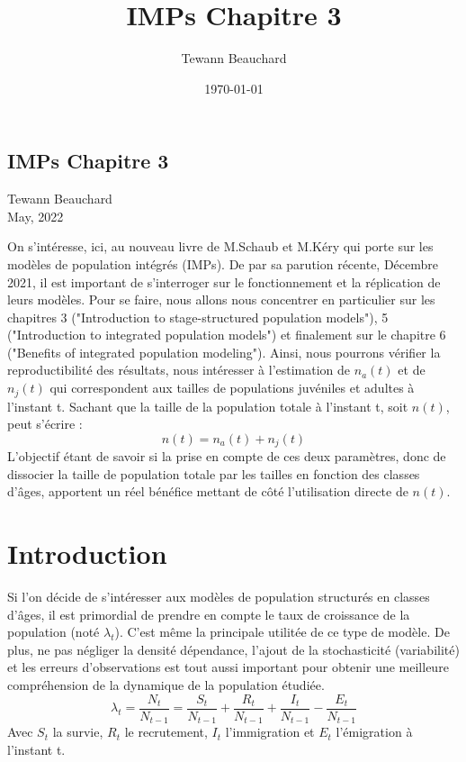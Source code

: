 \documentclass[12pt,a4paper]{article}
\title{IMPs Chapitre 3}
\date{\today}
\author{Tewann Beauchard}
\begin{document}
\begin{center}
\section*{IMPs Chapitre 3}
\vspace*{1cm}
Tewann Beauchard \\
\vspace*{1cm}
May, 2022
\end{center}
\vspace*{1cm}

On s'intéresse, ici, au nouveau livre de M.Schaub et M.Kéry qui porte sur les modèles de population intégrés (IMPs). De par sa parution récente, Décembre 2021, il est important de s'interroger sur le fonctionnement et la réplication de leurs modèles. Pour se faire, nous allons nous concentrer en particulier sur les chapitres 3 ("Introduction to stage-structured population models"), 5 ("Introduction to integrated population models") et finalement sur le chapitre 6 ("Benefits of integrated population modeling"). Ainsi, nous pourrons vérifier la reproductibilité des résultats, nous intéresser à l'estimation de $n_{a}(t)$ et de $n_{j}(t)$ qui correspondent aux tailles de populations juvéniles et adultes à l'instant t. Sachant que la taille de la population totale à l'instant t, soit $n(t)$, peut s'écrire : $$n(t)= n_{a}(t) + n_{j}(t)$$L'objectif étant de savoir si la prise en compte de ces deux paramètres, donc de dissocier la taille de population totale par les tailles en fonction des classes d'âges, apportent un réel bénéfice mettant de côté l'utilisation directe de $n(t)$.

\section{Introduction}
Si l'on décide de s'intéresser aux modèles de population structurés en classes d'âges, il est primordial de prendre en compte le taux de croissance de la population (noté $\lambda_{t}$). C'est même la principale utilitée de ce type de modèle. De plus, ne pas négliger la densité dépendance, l'ajout de la stochasticité (variabilité) et les erreurs d'observations est tout aussi important pour obtenir une meilleure compréhension de la dynamique de la population étudiée.
\begin{equation}
\lambda_{t}=\dfrac{N_{t}}{N_{t-1}}=\dfrac{S_{t}}{N_{t-1}}+\dfrac{R_{t}}{N_{t-1}}+\dfrac{I_{t}}{N_{t-1}}-\dfrac{E_{t}}{N_{t-1}}
\end{equation}
Avec $S_{t}$ la survie, $R_{t}$ le recrutement, $I_{t}$ l'immigration et $E_{t}$ l'émigration à l'instant t.
\end{document}
